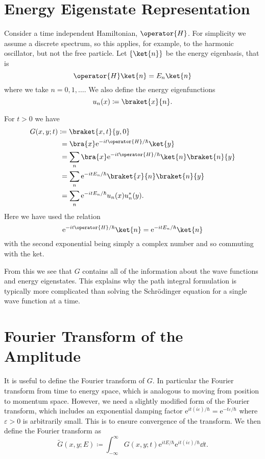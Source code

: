 \documentclass[fleqn]{NotesClass}
\newcommand*{\e}{\mathrm{e}}
\newcommand*{\hamiltonian}{H}
\begin{document}
    \section{Energy Eigenstate Representation}
    Consider a time independent Hamiltonian, \(\operator{\hamiltonian}\).
    For simplicity we assume a discrete spectrum, so this applies, for example, to the harmonic oscillator, but not the free particle.
    Let \(\{\ket{n}\}\) be the energy eigenbasis, that is
    \begin{equation}
        \operator{\hamiltonian}\ket{n} = E_n\ket{n}
    \end{equation}
    where we take \(n = 0, 1, \dotsc\).
    We also define the energy eigenfunctions
    \begin{equation}
        u_n(x) \coloneqq \braket{x}{n}.
    \end{equation}
    
    For \(t > 0\) we have
    \begin{align}
        G(x, y; t) &\coloneqq \braket{x, t}{y, 0}\\
        &\hphantom{:}= \bra{x} \e^{-it\operator{\hamiltonian}/\hbar}\ket{y}\\
        &\hphantom{:}= \sum_n \bra{x} \e^{-it\operator{\hamiltonian}/\hbar}\ket{n}\braket{n}{y}\\
        &\hphantom{:}= \sum_n \e^{-itE_n/\hbar}\braket{x}{n}\braket{n}{y}\\
        &\hphantom{:}= \sum_n \e^{-itE_n/\hbar} u_n(x)u_n^*(y).
    \end{align}
    Here we have used the relation
    \begin{equation}
        \e^{-it\operator{\hamiltonian}/\hbar}\ket{n} = \e^{-itE_n/\hbar}\ket{n}
    \end{equation}
    with the second exponential being simply a complex number and so commuting with the ket.
    
    From this we see that \(G\) contains all of the information about the wave functions and energy eigenstates.
    This explains why the path integral formulation is typically more complicated than solving the Schr\"odinger equation for a single wave function at a time.
    
    \section{Fourier Transform of the Amplitude}\label{sec:fourier transform of the amplitude}
    It is useful to define the Fourier transform of \(G\).
    In particular the Fourier transform from time to energy space, which is analogous to moving from position to momentum space.
    However, we need a slightly modified form of the Fourier transform, which includes an exponential damping factor \(\e^{it(i\varepsilon)/\hbar} = \e^{-t\varepsilon/\hbar}\) where \(\varepsilon > 0\) is arbitrarily small.
    This is to ensure convergence of the transform.
    We then define the Fourier transform as
    \begin{equation}
        \tilde{G}(x, y; E) \coloneqq \int_{-\infty}^{\infty} G(x, y; t)\e^{itE/\hbar}\e^{it(i\varepsilon)/\hbar} \dd{t}.
    \end{equation}
    
\end{document}
